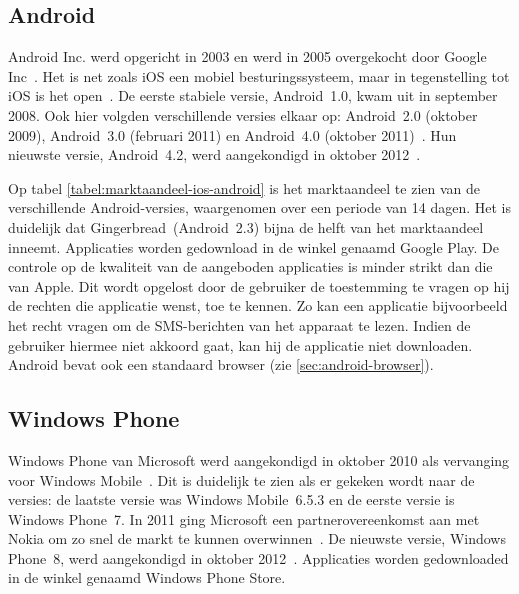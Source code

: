 \subsection{Android}
Android Inc. werd opgericht in 2003 en werd in 2005 overgekocht door Google Inc~\cite{Satyesh2012}. 
Het is net zoals iOS een mobiel besturingssysteem, maar in tegenstelling tot iOS is het open~\cite{David2011}. 
De eerste stabiele versie, Android~1.0, kwam uit in september 2008. 
Ook hier volgden verschillende versies elkaar op: Android~2.0 (oktober 2009), Android~3.0 (februari 2011) en Android~4.0 (oktober 2011)~\cite{Satyesh2012}. 
Hun nieuwste versie, Android~4.2, werd aangekondigd in oktober 2012~\cite{Sawers2012}. 

Op tabel \ref{tabel:marktaandeel-ios-android} is het marktaandeel te zien van de verschillende Android-versies, waargenomen over een periode van 14 dagen. 
Het is duidelijk dat Gingerbread~(Android~2.3) bijna de helft van het marktaandeel inneemt.
Applicaties worden gedownload in de winkel genaamd Google Play. 
De controle op de kwaliteit van de aangeboden applicaties is minder strikt dan die van Apple.
Dit wordt opgelost door de gebruiker de toestemming te vragen op hij de rechten die applicatie wenst, toe te kennen.
Zo kan een applicatie bijvoorbeeld het recht vragen om de SMS-berichten van het apparaat te lezen.
Indien de gebruiker hiermee niet akkoord gaat, kan hij de applicatie niet downloaden.
Android bevat ook een standaard browser (zie \ref{sec:android-browser}).

\subsection{Windows Phone}
Windows Phone van Microsoft werd aangekondigd in oktober 2010 als vervanging voor Windows Mobile~\cite{Seitz2010,Lieberman2010}. 
Dit is duidelijk te zien als er gekeken wordt naar de versies: de laatste versie was Windows Mobile~6.5.3 en de eerste versie is Windows Phone~7. 
In 2011 ging Microsoft een partnerovereenkomst aan met Nokia om zo snel de markt te kunnen overwinnen~\cite{Microsoft2011}. 
De nieuwste versie, Windows Phone~8, werd aangekondigd in oktober 2012~\cite{Reed2012}. 
Applicaties worden gedownloaded in de winkel genaamd Windows Phone Store.


